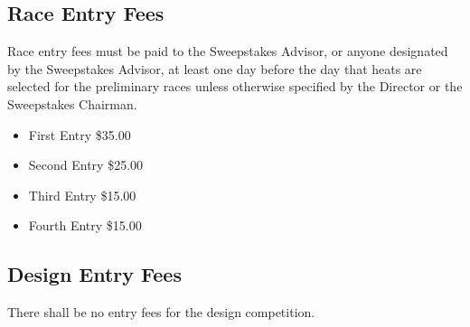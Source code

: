 \subsection{Race Entry Fees}

Race entry fees must be paid to the Sweepstakes Advisor, or anyone designated by the Sweepstakes Advisor, at least one day before the day that heats are selected for the preliminary races unless otherwise specified by the Director or the Sweepstakes Chairman.

\begin{itemize}
	\item First Entry \$35.00
	\item Second Entry \$25.00
	\item Third Entry \$15.00
	\item Fourth Entry \$15.00
\end{itemize}

\subsection{Design Entry Fees}

There shall be no entry fees for the design competition.



